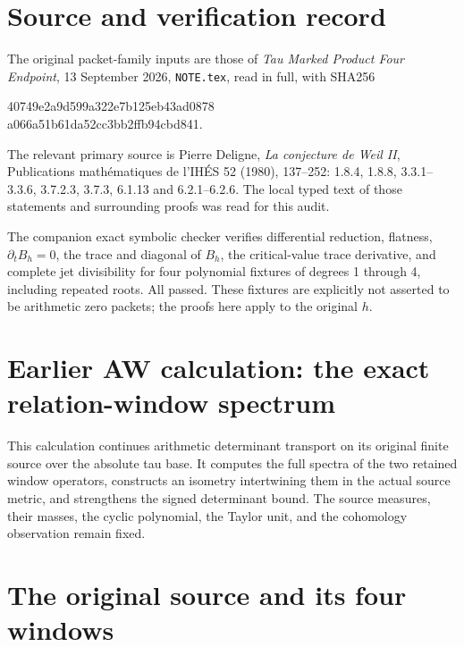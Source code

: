 \documentclass[11pt,a4paper]{article}
\begin{document}
\section*{Source and verification record}
The original packet-family inputs are those of
\emph{Tau Marked Product Four Endpoint}, 13 September 2026,
\texttt{NOTE.tex}, read in full, with SHA256
\begin{center}\ttfamily\small
40749e2a9d599a322e7b125eb43ad0878\\
a066a51b61da52cc3bb2ffb94cbd841.
\end{center}
The relevant primary source is Pierre Deligne,
\emph{La conjecture de Weil II}, Publications math\'ematiques de
l'IH\'ES 52 (1980), 137--252: 1.8.4, 1.8.8, 3.3.1--3.3.6,
3.7.2.3, 3.7.3, 6.1.13 and 6.2.1--6.2.6.  The local typed text of
those statements and surrounding proofs was read for this audit.

The companion exact symbolic checker verifies differential reduction,
flatness, $\partial_tB_h=0$, the trace and diagonal of $B_h$, the
critical-value trace derivative, and complete jet divisibility for four
polynomial fixtures of degrees 1 through 4, including repeated roots.
All passed.  These fixtures are explicitly not asserted to be
arithmetic zero packets; the proofs here apply to the original $h$.

\endgroup
\clearpage

\section*{Earlier AW calculation: the exact relation-window spectrum}



This calculation continues arithmetic determinant transport on its original
finite source over the absolute tau base. It computes the full spectra of
the two retained window operators, constructs an isometry intertwining
them in the actual source metric, and strengthens the signed determinant
bound. The source measures, their masses, the cyclic polynomial, the
Taylor unit, and the cohomology observation remain fixed.

\section{The original source and its four windows}
\end{document}
